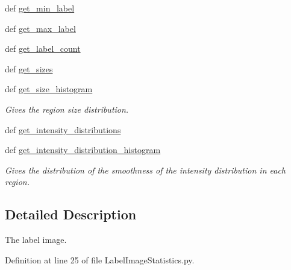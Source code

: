 \begin{DoxyCompactItemize}
def \hyperlink{classmedpy_1_1filter_1_1LabelImageStatistics_1_1LabelImageStatistics_a257d8c1a5996612b6e38257316c8eb4d}{get\_\-min\_\-label}
\item 
def \hyperlink{classmedpy_1_1filter_1_1LabelImageStatistics_1_1LabelImageStatistics_a178846f8509e6dc284f1280827720a36}{get\_\-max\_\-label}
\item 
def \hyperlink{classmedpy_1_1filter_1_1LabelImageStatistics_1_1LabelImageStatistics_a4a4efd07eeb97f0474d6b0938f1c9346}{get\_\-label\_\-count}
\item 
def \hyperlink{classmedpy_1_1filter_1_1LabelImageStatistics_1_1LabelImageStatistics_a22329b52becafadd81103650e5bd0da1}{get\_\-sizes}
\item 
def \hyperlink{classmedpy_1_1filter_1_1LabelImageStatistics_1_1LabelImageStatistics_a418bb33624949145cdc0fe1fa6562451}{get\_\-size\_\-histogram}
\begin{DoxyCompactList}\small\item\em Gives the region size distribution. \end{DoxyCompactList}\item 
def \hyperlink{classmedpy_1_1filter_1_1LabelImageStatistics_1_1LabelImageStatistics_a9bea3a398baf6ee92218fc257474ee4a}{get\_\-intensity\_\-distributions}
\item 
def \hyperlink{classmedpy_1_1filter_1_1LabelImageStatistics_1_1LabelImageStatistics_a37da9517c63c76675a4df75c2d13d672}{get\_\-intensity\_\-distribution\_\-histogram}
\begin{DoxyCompactList}\small\item\em Gives the distribution of the smoothness of the intensity distribution in each region. \end{DoxyCompactList}\end{DoxyCompactItemize}


\subsection{Detailed Description}
\begin{DoxyVerb}The label image.\end{DoxyVerb}
 

Definition at line 25 of file LabelImageStatistics.py.



